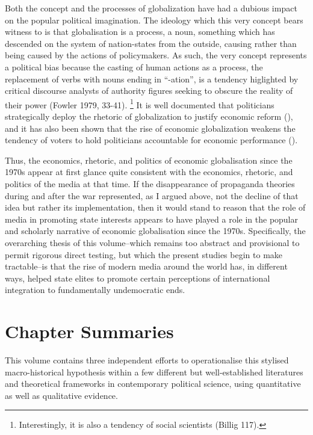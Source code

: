 \documentclass[12pt]{report}
\begin{document}
Both the concept and the processes of globalization have had a dubious
impact on the popular political imagination. The ideology which this
very concept bears witness to is that globalisation is a process,
a noun, something which has descended on the system of nation-states
from the outside, causing rather than being caused by the actions
of policymakers. As such, the very concept represents a political
bias because the casting of human actions as a process, the replacement
of verbs with nouns ending in ``-ation'', is a tendency higlighted
by critical discourse analysts of authority figures seeking to obscure
the reality of their power (Fowler 1979, 33-41).%
\footnote{Interestingly, it is also a tendency of social scientists (Billig
117).%
} It is well documented that politicians strategically deploy the rhetoric
of globalization to justify economic reform (\citealt{Hay:2011dh}),
and it has also been shown that the rise of economic globalization
weakens the tendency of voters to hold politicians accountable for
economic performance (\citealt{Hellwig:2007gn,Hellwig:2007jr}). 

Thus, the economics, rhetoric, and politics of economic globalisation
since the 1970s appear at first glance quite consistent with the economics,
rhetoric, and politics of the media at that time. If the disappearance
of propaganda theories during and after the war represented, as I
argued above, not the decline of that idea but rather its implementation,
then it would stand to reason that the role of media in promoting
state interests appears to have played a role in the popular and scholarly
narrative of economic globalisation since the 1970s. Specifically,
the overarching thesis of this volume--which remains too abstract
and provisional to permit rigorous direct testing, but which the present
studies begin to make tractable--is that the rise of modern media
around the world has, in different ways, helped state elites to promote
certain perceptions of international integration to fundamentally
undemocratic ends.


\section{Chapter Summaries}

This volume contains three independent efforts to operationalise this
stylised macro-historical hypothesis within a few different but well-established
literatures and theoretical frameworks in contemporary political science,
using quantitative as well as qualitative evidence.
\end{document}
